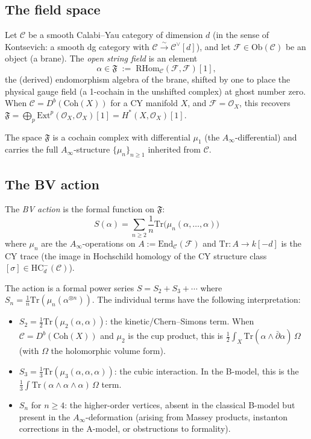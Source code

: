 \documentclass[11pt]{amsart}
\theoremstyle{plain}
\theoremstyle{definition}
\theoremstyle{remark}
\newcommand{\Ainf}{A_\infty}
\newcommand{\Coh}{\mathrm{Coh}}
\newcommand{\HC}{\mathrm{HC}}
\newcommand{\Tr}{\mathrm{Tr}}
\newcommand{\RHom}{\mathrm{RHom}}
\newcommand{\Ext}{\mathrm{Ext}}
\newcommand{\End}{\mathrm{End}}
\newcommand{\cC}{\mathcal{C}}
\newcommand{\cF}{\mathcal{F}}
\newcommand{\cO}{\mathcal{O}}
\begin{document}
\subsection{The field space}
\label{subsec:field-space}

Let $\cC$ be a smooth Calabi--Yau category of dimension $d$ (in the sense of Kontsevich: a smooth dg category with $\cC \xrightarrow{\sim} \cC^\vee[d]$), and let $\cF \in \mathrm{Ob}(\cC)$ be an object (a brane). The \emph{open string field} is an element
\begin{equation}\label{eq:field-space}
 \alpha \in \mathfrak{F} \;:=\; \RHom_\cC(\cF, \cF)[1],
\end{equation}
the (derived) endomorphism algebra of the brane, shifted by one to place the physical gauge field (a 1-cochain in the unshifted complex) at ghost number zero. When $\cC = D^b(\Coh(X))$ for a CY manifold $X$, and $\cF = \cO_X$, this recovers $\mathfrak{F} = \bigoplus_p \Ext^p(\cO_X, \cO_X)[1] = H^*(X, \cO_X)[1]$.

The space $\mathfrak{F}$ is a cochain complex with differential $\mu_1$ (the $\Ainf$-differential) and carries the full $\Ainf$-structure $\{\mu_n\}_{n \geq 1}$ inherited from $\cC$.

\subsection{The BV action}
\label{subsec:bv-action}

The \emph{BV action} is the formal function on $\mathfrak{F}$:
\begin{equation}\label{eq:bv-action}
 \boxed{
 S(\alpha) = \sum_{n \geq 2} \frac{1}{n} \Tr\bigl(\mu_n(\alpha, \ldots, \alpha)\bigr)
 }
\end{equation}
where $\mu_n$ are the $\Ainf$-operations on $A := \End_\cC(\cF)$ and $\Tr \colon A \to k[-d]$ is the CY trace (the image in Hochschild homology of the CY structure class $[\sigma] \in \HC^-_d(\cC)$).

The action is a formal power series $S = S_2 + S_3 + \cdots$ where $S_n = \frac{1}{n}\Tr(\mu_n(\alpha^{\otimes n}))$. The individual terms have the following interpretation:

\begin{itemize}
 \item $S_2 = \frac{1}{2}\Tr(\mu_2(\alpha, \alpha))$: the kinetic/Chern--Simons term. When $\cC = D^b(\Coh(X))$ and $\mu_2$ is the cup product, this is $\frac{1}{2}\int_X \Tr(\alpha \wedge \bar\partial \alpha) \,\Omega$ (with $\Omega$ the holomorphic volume form).
 \item $S_3 = \frac{1}{3}\Tr(\mu_3(\alpha, \alpha, \alpha))$: the cubic interaction. In the B-model, this is the $\frac{1}{3}\int \Tr(\alpha \wedge \alpha \wedge \alpha)\,\Omega$ term.
 \item $S_n$ for $n \geq 4$: the higher-order vertices, absent in the classical B-model but present in the $\Ainf$-deformation (arising from Massey products, instanton corrections in the A-model, or obstructions to formality).
\end{itemize}
\end{document}
